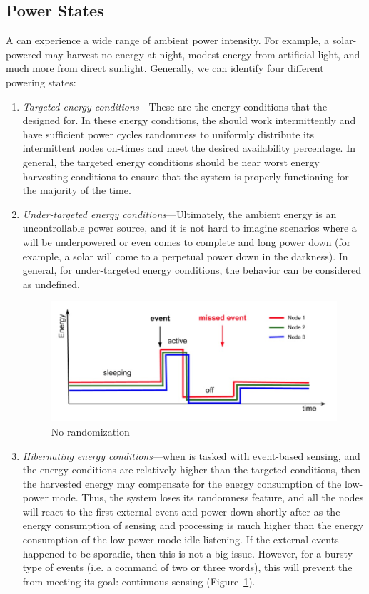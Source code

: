 \subsection{Power States}
A \sys can experience a wide range of ambient power intensity. For example, a solar-powered \sys may harvest no energy at night, modest energy from artificial light, and much more from direct sunlight.  Generally, we can identify four different \sys powering states: 
\begin{enumerate}
		\item \textit{Targeted energy conditions}---These are the energy conditions that the \sys designed for. In these energy conditions, the \sys should work intermittently and have sufficient power cycles randomness to uniformly distribute its intermittent nodes on-times and meet the desired availability percentage. In general, the targeted energy conditions should be near worst energy harvesting conditions to ensure that the system is properly functioning for the majority of the time.
		\item \textit{Under-targeted energy conditions}---Ultimately, the ambient energy is an uncontrollable power source, and it is not hard to imagine scenarios where a \sys will be underpowered or even comes to complete and long power down (for example, a solar \sys will come to a perpetual power down in the darkness). In general, for under-targeted energy conditions, the \sys behavior can be considered as undefined.
%
\begin{figure}
		\centering
		\includegraphics[width=\columnwidth]{figures/noRandomization}
		\caption{ No randomization}
		\label{fig:noRand}
\end{figure} 
%
		\item \label{it:hibernating} \textit{Hibernating energy conditions}---when \sys is tasked with event-based sensing, and the energy conditions are relatively higher than the targeted conditions, then the harvested energy may compensate for the energy consumption of the low-power mode. Thus, the system loses its randomness feature, and all the nodes will react to the first external event and power down shortly after as the energy consumption of sensing and processing is much higher than the energy consumption of the low-power-mode idle listening. If the external events happened to be sporadic, then this is not a big issue. However, for a bursty type of events (i.e. a command of two or three words), this will prevent the \sys from meeting its goal: continuous sensing (Figure~\ref{fig:noRand}). 

\end{enumerate}
